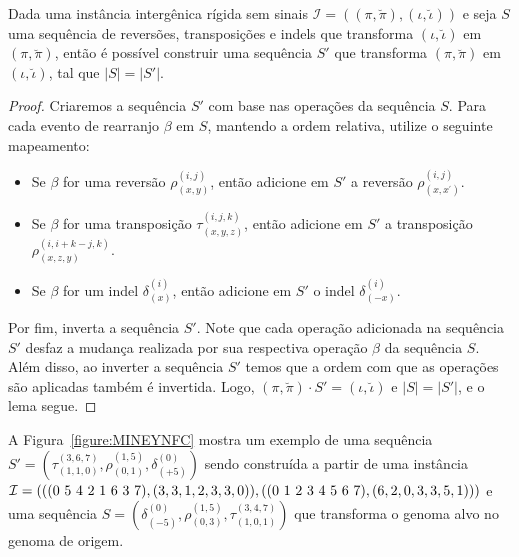 \begin{lemma}\label{lemma:UWWIFTBQ}
Dada uma instância intergênica rígida sem sinais $\mathcal{I} = ((\pi,\breve\pi),(\iota,\breve\iota))$ e seja $S$ uma sequência de reversões, transposições e indels que transforma $(\iota,\breve\iota)$ em $(\pi,\breve\pi)$, então é possível construir uma sequência $S'$ que transforma $(\pi,\breve\pi)$ em $(\iota,\breve\iota)$, tal que $|S| = |S'|$.
\end{lemma}
\begin{proof}
Criaremos a sequência $S'$ com base nas operações da sequência $S$. Para cada evento de rearranjo $\beta$ em $S$, mantendo a ordem relativa, utilize o seguinte mapeamento:
\begin{itemize}
  \item Se $\beta$ for uma reversão $\rho^{(i,j)}_{(x,y)}$, então adicione em $S'$ a reversão $\rho^{(i,j)}_{(x,x^{\prime})}$.
  \item Se $\beta$ for uma transposição $\tau^{(i,j,k)}_{(x,y,z)}$, então adicione em $S'$ a transposição $\rho^{(i,i+k-j,k)}_{(x,z,y)}$.
  \item Se $\beta$ for um indel $\delta^{(i)}_{(x)}$, então adicione em $S'$ o indel $\delta^{(i)}_{(-x)}$. 
\end{itemize}  
Por fim, inverta a sequência $S'$. Note que cada operação adicionada na sequência $S'$ desfaz a mudança realizada por sua respectiva operação $\beta$ da sequência $S$. Além disso, ao inverter a sequência $S'$ temos que a ordem com que as operações são aplicadas também é invertida. Logo, $(\pi,\breve\pi) \cdot S' = (\iota,\breve\iota)$ e $|S| = |S'|$, e o lema segue.
\end{proof}

A Figura~\ref{figure:MINEYNFC} mostra um exemplo de uma sequência $S'=(\tau^{(3,6,7)}_{(1,1,0)},\rho^{(1,5)}_{(0,1)},\delta^{(0)}_{({+5})})$ sendo construída a partir de uma instância $\mathcal{I} = (((0~5~4~2~1~6~3~7),(3,3,1,2,3,3,0)),((0~1~2~\break3~4~5~6~7),(6,2,0,3,3,5,1)))$ e uma sequência $S=(\delta^{(0)}_{({-5})},\rho^{(1,5)}_{(0,3)},\tau^{(3,4,7)}_{(1,0,1)})$ que transforma o genoma alvo no genoma de origem.



